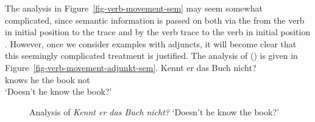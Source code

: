 {{The analysis in Figure~\ref{fig-verb-movement-sem} may seem somewhat complicated, since semantic information is passed on both
via the \dsl from the verb in initial position to the trace  and by the verb trace to the verb in
initial position . However, once we consider examples with adjuncts, it will become clear that this seemingly complicated treatment is justified. The analysis of () is given in 
Figure~\vref{fig-verb-movement-adjunkt-sem}.
\ea
\gll Kennt er das Buch nicht?\\
	 knows he the book not\\
\glt `Doesn't he know the book?'
\z
\begin{figure}
\caption{Analysis of \emph{Kennt er das Buch nicht?} `Doesn't he
  know the book?'}\label{fig-verb-movement-adjunkt-sem}
\end{figure}


}}
